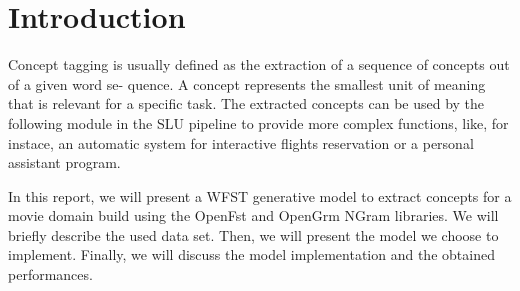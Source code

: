 \section{Introduction}
\label{sec:introduction}

Concept tagging is usually defined as the extraction of a sequence of concepts out of a given word se- quence.
A concept represents the smallest unit of meaning that is relevant for a specific task.
The extracted concepts can be used by the following module in the \ac{SLU} pipeline to provide more complex functions,
like, for instace, an automatic system for interactive flights reservation or a personal assistant program.

In this report, we will present a \ac{WFST} generative model to extract concepts for a movie domain build using the OpenFst and OpenGrm NGram libraries.
We will briefly describe the used data set.
Then, we will present the model we choose to implement.
Finally, we will discuss the model implementation and the obtained performances.
